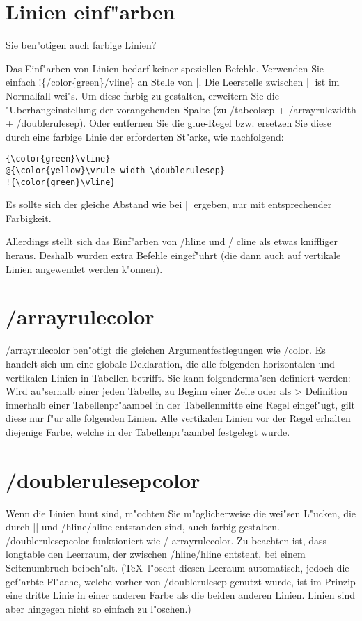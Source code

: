 \documentclass[ngerman]{article}
\begin{document}
\section{Linien einf"arben}

Sie ben"otigen auch farbige Linien?

Das Einf"arben von Linien bedarf keiner speziellen Befehle. Verwenden Sie
einfach !\{\slash \textsf{color}\{green\}\slash \textsf{vline}\} an Stelle von |. Die Leerstelle 
zwischen || ist im Normalfall wei"s. Um diese farbig zu gestalten, erweitern Sie die 
"Uberhangeinstellung der vorangehenden Spalte (zu \slash \textsf{tabcolsep}
+ \slash \textsf{arrayrulewidth} + \slash \textsf{doublerulesep}). Oder entfernen Sie die glue-Regel 
bzw. ersetzen Sie diese durch eine farbige Linie der erforderten St"arke,
wie nachfolgend: 

\begin{verbatim}
{\color{green}\vline}
@{\color{yellow}\vrule width \doublerulesep}
!{\color{green}\vline}
\end{verbatim}

Es sollte sich der gleiche Abstand wie bei || ergeben, nur mit entsprechender Farbigkeit.

Allerdings stellt sich das Einf"arben von \slash \textsf{hline} und \slash
\textsf{cline} als etwas kniffliger heraus. Deshalb wurden extra Befehle eingef"uhrt (die dann auch 
auf vertikale Linien angewendet werden k"onnen).

\section{\slash \textsf{arrayrulecolor}}

\slash \textsf{arrayrulecolor} ben"otigt die gleichen Argumentfestlegungen
wie \slash \textsf{color}. Es handelt sich um eine globale Deklaration, die alle folgenden 
horizontalen und vertikalen Linien in Tabellen betrifft. Sie kann
folgenderma"sen definiert werden: Wird au"serhalb einer jeden Tabelle, zu Beginn einer Zeile oder 
als > Definition innerhalb einer Tabellenpr"aambel in der Tabellenmitte eine Regel eingef"ugt, gilt 
diese nur f"ur alle folgenden Linien. Alle vertikalen Linien vor der Regel erhalten diejenige Farbe, 
welche in der Tabellenpr"aambel festgelegt wurde.

\section{\slash \textsf{doublerulesepcolor}}
Wenn die Linien bunt sind, m"ochten Sie m"oglicherweise die wei"sen L"ucken, die durch || und 
\slash \textsf{hline}\slash \textsf{hline} entstanden sind, auch farbig gestalten. 
\slash \textsf{doublerulesepcolor} funktioniert wie \slash
\textsf{arrayrulecolor}. Zu beachten ist, dass \textsf{longtable} den Leerraum, der zwischen 
\slash \textsf{hline}\slash \textsf{hline} entsteht, bei einem
Seitenumbruch beibeh"alt. (\TeX\ 
l"oscht diesen Leeraum automatisch, jedoch  die gef"arbte Fl"ache, welche
vorher von \slash \textsf{doublerulesep} genutzt wurde, 
ist im Prinzip eine dritte Linie in einer anderen Farbe als die beiden 
anderen Linien. Linien sind aber hingegen nicht so einfach zu l"oschen.)
\end{document}
